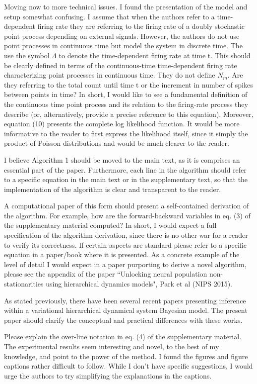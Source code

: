 \documentclass[12pt,a4paper]{article}
\begin{document}
Moving now to more technical issues. I found the presentation of the model and setup somewhat confusing. I assume that when the authors refer to a time-dependent firing rate they are referring to the firing rate of a doubly stochastic point process depending on external signals. However, the authors do not use point processes in continuous time but model the system in discrete time. The use the symbol $\Lambda$ to denote the time-dependent firing rate at time t. This should be clearly defined in terms of the continuous-time time-dependent firing rate characterizing point processes in continuous time. They do not define $N_m$. Are they referring to the total count until time t or the increment in number of spikes between points in time? In short, I would like to see a fundamental definition of the continuous time point process and its relation to the firing-rate process they describe (or, alternatively, provide a precise reference to this equation). Moreover, equation (10) presents the complete log likelihood function. It would be more informative to the reader to first express the likelihood itself, since it simply the product of Poisson distributions and would be much clearer to the reader.

I believe Algorithm 1 should be moved to the main text, as it is comprises an essential part of the paper. Furthermore, each line in the algorithm should refer to a specific equation in the main text or in the supplementary text, so that the implementation of the algorithm is clear and transparent to the reader.

A computational paper of this form should present a self-contained derivation of the algorithm. For example, how are the forward-backward variables in eq. (3) of the supplementary material computed? In short, I would expect a full specification of the algorithm derivation, since there is no other war for a reader to verify its correctness. If certain aspects are standard please refer to a specific equation in a paper/book where it is presented. As a concrete example of the level of detail I would expect in a paper purporting to derive a novel algorithm, please see the appendix of the paper “Unlocking neural population non-stationarities using hierarchical dynamics models", Park et al (NIPS 2015).

As stated previously, there have been several recent papers presenting inference within a variational hierarchical dynamical system Bayesian model. The present paper should clarify the conceptual and practical differences with these works.

Please explain the over-line notation in eq. (4) of the supplementary material.
The experimental results seem interesting and novel, to the best of my knowledge, and point to the power of the method. I found the figures and figure captions rather difficult to follow. While I don’t have specific suggestions, I would urge the authors to try simplifying the explanations in the captions.
\end{document}
